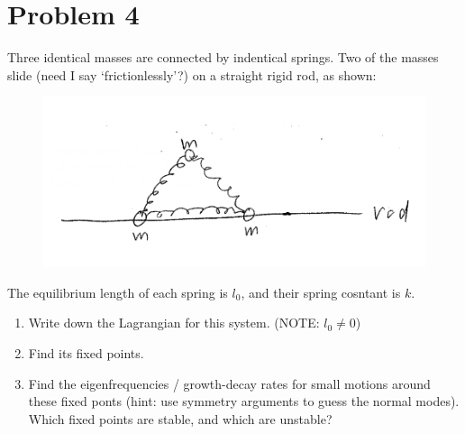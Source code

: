 \documentclass[12pt]{article}
\begin{document}
\section*{Problem 4}
Three identical masses are connected by indentical springs. Two of the masses slide (need I say `frictionlessly'?) on a straight rigid rod, as shown:
\begin{figure}[H]
    \includegraphics{Problem4}
    \centering
\end{figure}
The equilibrium length of each spring is $l_0$, and their spring cosntant is $k$.
\begin{enumerate}[label=(\alph*)]
    \item Write down the Lagrangian for this system. (NOTE: $l_0 \neq 0$)
    \item Find its fixed points.
    \item Find the eigenfrequencies / growth-decay rates for small motions around these fixed ponts (hint: use symmetry arguments to guess the normal modes). Which fixed points are stable, and which are unstable?
\end{enumerate}
\end{document}
